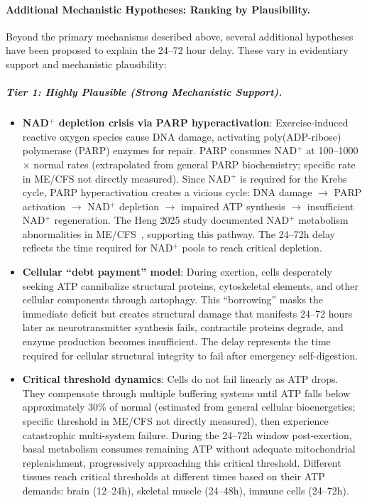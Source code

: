 \paragraph{Additional Mechanistic Hypotheses: Ranking by Plausibility.}

Beyond the primary mechanisms described above, several additional hypotheses have been proposed to explain the 24--72 hour delay. These vary in evidentiary support and mechanistic plausibility:

\subparagraph{Tier 1: Highly Plausible (Strong Mechanistic Support).}

\begin{itemize}
    \item \textbf{NAD$^+$ depletion crisis via PARP hyperactivation}: Exercise-induced reactive oxygen species cause DNA damage, activating poly(ADP-ribose) polymerase (PARP) enzymes for repair. PARP consumes NAD$^+$ at 100--1000$\times$ normal rates (extrapolated from general PARP biochemistry; specific rate in ME/CFS not directly measured). Since NAD$^+$ is required for the Krebs cycle, PARP hyperactivation creates a vicious cycle: DNA damage $\rightarrow$ PARP activation $\rightarrow$ NAD$^+$ depletion $\rightarrow$ impaired ATP synthesis $\rightarrow$ insufficient NAD$^+$ regeneration. The Heng 2025 study documented NAD$^+$ metabolism abnormalities in ME/CFS~\cite{heng2025mecfs}, supporting this pathway. The 24--72h delay reflects the time required for NAD$^+$ pools to reach critical depletion.

    \item \textbf{Cellular ``debt payment'' model}: During exertion, cells desperately seeking ATP cannibalize structural proteins, cytoskeletal elements, and other cellular components through autophagy. This ``borrowing'' masks the immediate deficit but creates structural damage that manifests 24--72 hours later as neurotransmitter synthesis fails, contractile proteins degrade, and enzyme production becomes insufficient. The delay represents the time required for cellular structural integrity to fail after emergency self-digestion.

    \item \textbf{Critical threshold dynamics}: Cells do not fail linearly as ATP drops. They compensate through multiple buffering systems until ATP falls below approximately 30\% of normal (estimated from general cellular bioenergetics; specific threshold in ME/CFS not directly measured), then experience catastrophic multi-system failure. During the 24--72h window post-exertion, basal metabolism consumes remaining ATP without adequate mitochondrial replenishment, progressively approaching this critical threshold. Different tissues reach critical thresholds at different times based on their ATP demands: brain (12--24h), skeletal muscle (24--48h), immune cells (24--72h).
\end{itemize}

